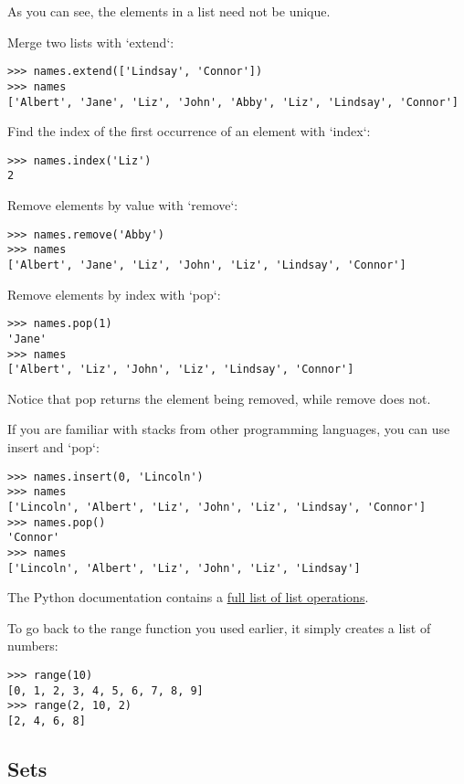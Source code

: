 As you can see, the elements in a list need not be unique.

Merge two lists with `extend`:

\begin{verbatim}
>>> names.extend(['Lindsay', 'Connor'])
>>> names
['Albert', 'Jane', 'Liz', 'John', 'Abby', 'Liz', 'Lindsay', 'Connor']
\end{verbatim}

Find the index of the first occurrence of an element with `index`:

\begin{verbatim}
>>> names.index('Liz')
2
\end{verbatim}

Remove elements by value with `remove`:

\begin{verbatim}
>>> names.remove('Abby')
>>> names
['Albert', 'Jane', 'Liz', 'John', 'Liz', 'Lindsay', 'Connor']
\end{verbatim}

Remove elements by index with `pop`:

\begin{verbatim}
>>> names.pop(1)
'Jane'
>>> names
['Albert', 'Liz', 'John', 'Liz', 'Lindsay', 'Connor']
\end{verbatim}

Notice that pop returns the element being removed, while remove does
not.

If you are familiar with stacks from other programming languages, you
can use insert and `pop`:

\begin{verbatim}
>>> names.insert(0, 'Lincoln')
>>> names
['Lincoln', 'Albert', 'Liz', 'John', 'Liz', 'Lindsay', 'Connor']
>>> names.pop()
'Connor'
>>> names
['Lincoln', 'Albert', 'Liz', 'John', 'Liz', 'Lindsay']
\end{verbatim}

The Python documentation contains a \href{}{full list of list
operations}.

To go back to the range function you used earlier, it simply creates a
list of numbers:

\begin{verbatim}
>>> range(10)
[0, 1, 2, 3, 4, 5, 6, 7, 8, 9]
>>> range(2, 10, 2)
[2, 4, 6, 8]
\end{verbatim}

\subsection{Sets}\label{sets}

